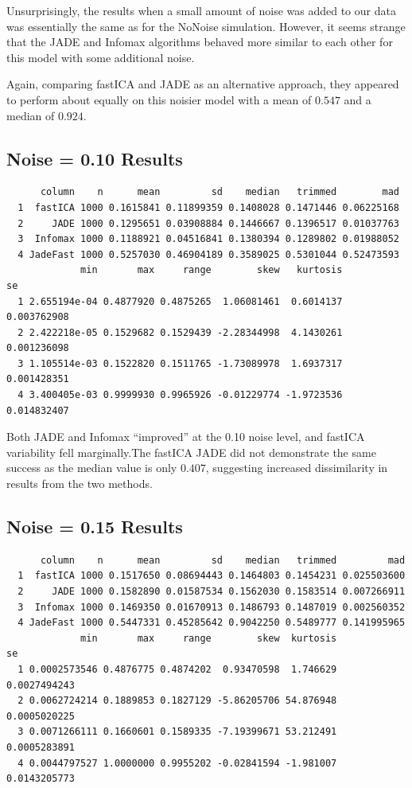 \documentclass[12pt,twoside]{amherstthesis}
\begin{document}
  Unsurprisingly, the results when a small amount of noise was added to
  our data was essentially the same as for the NoNoise simulation.
  However, it seems strange that the JADE and Infomax algorithms behaved
  more similar to each other for this model with some additional noise.
  
  Again, comparing fastICA and JADE as an alternative approach, they
  appeared to perform about equally on this noisier model with a mean of
  \(0.547\) and a median of \(0.924\).
  
  \subsection{Noise = 0.10 Results}\label{noise-0.10-results}
  
  \begin{verbatim}
      column    n      mean         sd    median   trimmed        mad
  1  fastICA 1000 0.1615841 0.11899359 0.1408028 0.1471446 0.06225168
  2     JADE 1000 0.1295651 0.03908884 0.1446667 0.1396517 0.01037763
  3  Infomax 1000 0.1188921 0.04516841 0.1380394 0.1289802 0.01988052
  4 JadeFast 1000 0.5257030 0.46904189 0.3589025 0.5301044 0.52473593
             min       max     range        skew   kurtosis          se
  1 2.655194e-04 0.4877920 0.4875265  1.06081461  0.6014137 0.003762908
  2 2.422218e-05 0.1529682 0.1529439 -2.28344998  4.1430261 0.001236098
  3 1.105514e-03 0.1522820 0.1511765 -1.73089978  1.6937317 0.001428351
  4 3.400405e-03 0.9999930 0.9965926 -0.01229774 -1.9723536 0.014832407
  \end{verbatim}
  
  Both JADE and Infomax ``improved'' at the 0.10 noise level, and fastICA
  variability fell marginally.The fastICA JADE did not demonstrate the
  same success as the median value is only \(0.407\), suggesting increased
  dissimilarity in results from the two methods.
  
  \subsection{Noise = 0.15 Results}\label{noise-0.15-results}
  
  \begin{verbatim}
      column    n      mean         sd    median   trimmed         mad
  1  fastICA 1000 0.1517650 0.08694443 0.1464803 0.1454231 0.025503600
  2     JADE 1000 0.1582890 0.01587534 0.1562030 0.1583514 0.007266911
  3  Infomax 1000 0.1469350 0.01670913 0.1486793 0.1487019 0.002560352
  4 JadeFast 1000 0.5447331 0.45285642 0.9042250 0.5489777 0.141995965
             min       max     range        skew  kurtosis           se
  1 0.0002573546 0.4876775 0.4874202  0.93470598  1.746629 0.0027494243
  2 0.0062724214 0.1889853 0.1827129 -5.86205706 54.876948 0.0005020225
  3 0.0071266111 0.1660601 0.1589335 -7.19399671 53.212491 0.0005283891
  4 0.0044797527 1.0000000 0.9955202 -0.02841594 -1.981007 0.0143205773
  \end{verbatim}
  
\end{document}

